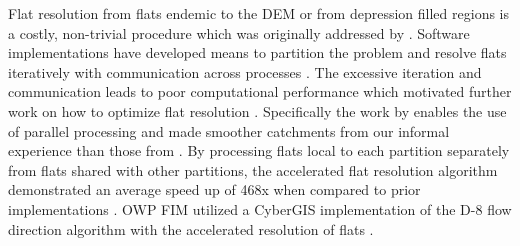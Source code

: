 \documentclass[draft]{dependencies/agujournal2019}
\begin{document}
Flat resolution from flats endemic to the DEM or from depression filled regions is a costly, non-trivial procedure which was originally addressed by .  
Software implementations have developed means to partition the problem and resolve flats iteratively with communication across processes \cite{tarboton2009generalized,tesfa2011extraction,wallis2009parallel,tarboton2005terrain}.
The excessive iteration and communication leads to poor computational performance which motivated further work on how to optimize flat resolution \cite{survila2016scalable,barnes2014efficient}.
Specifically the work by  enables the use of parallel processing and made smoother catchments from our informal experience than those from .
By processing flats local to each partition separately from flats shared with other partitions, the accelerated flat resolution algorithm demonstrated an average speed up of 468x when compared to prior implementations \cite{survila2016scalable}.
OWP FIM utilized a CyberGIS implementation of the D-8 flow direction algorithm with the accelerated resolution of flats \cite{survila2016scalable,cybergis2016}.
%
\end{document}
